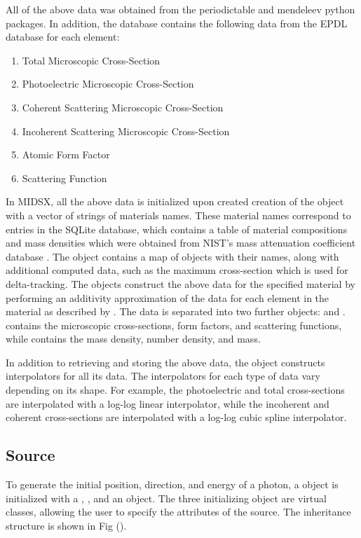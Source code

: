 All of the above data was obtained from the periodictable \cite{periodictable2022} and mendeleev \cite{mendeleev2021} python packages. In addition, the database contains the following data from the EPDL database \cite{cullen_survey_nodate} for each element:

\begin{enumerate}
    \item Total Microscopic Cross-Section
    \item Photoelectric Microscopic Cross-Section
    \item Coherent Scattering Microscopic Cross-Section
    \item Incoherent Scattering Microscopic Cross-Section
    \item Atomic Form Factor
    \item Scattering Function
\end{enumerate}

\par In MIDSX, all the above data is initialized upon created creation of the  object with a vector of strings of materials names. These material names correspond to entries in the SQLite database, which contains a table of material compositions and mass densities which were obtained from NIST's mass attenuation coefficient database \cite{hubbell_x-ray_2004}. The  object contains a map of  objects with their names, along with additional computed data, such as the maximum cross-section which is used for delta-tracking. The  objects construct the above data for the specified material by performing an additivity approximation of the data for each element in the material as described by \cite{HUSSEIN2007153}. The data is separated into two further objects:  and .  contains the microscopic cross-sections, form factors, and scattering functions, while  contains the mass density, number density, and mass.

In addition to retrieving and storing the above data, the  object constructs interpolators for all its data. The interpolators for each type of data vary depending on its shape. For example, the photoelectric and total cross-sections are interpolated with a log-log linear interpolator, while the incoherent and coherent cross-sections are interpolated with a log-log cubic spline interpolator.

\subsection{Source}
    To generate the initial position, direction, and energy of a photon, a  object is initialized with a , , and an  object. The three initializing object are virtual classes, allowing the user to specify the attributes of the source. The inheritance structure is shown in Fig (). 


